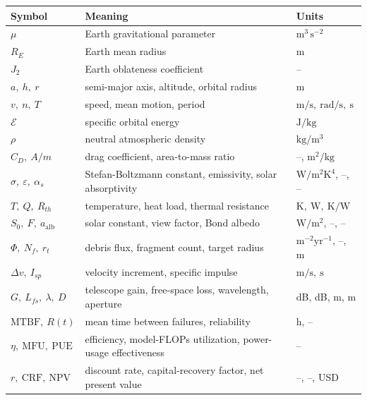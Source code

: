 \documentclass[
  11pt,
  openany,
  oneside]{book}
\newcounter{none} %
\begin{document}
{\def\LTcaptype{none} %
\begin{longtable}[]{@{}
  >{\raggedright\arraybackslash}p{}
  >{\raggedright\arraybackslash}p{}
  >{\raggedright\arraybackslash}p{}@{}}
\toprule\noalign{}
\begin{minipage}[b]{\linewidth}\raggedright
Symbol
\end{minipage} & \begin{minipage}[b]{\linewidth}\raggedright
Meaning
\end{minipage} & \begin{minipage}[b]{\linewidth}\raggedright
Units
\end{minipage} \\
\midrule\noalign{}
\endhead
\bottomrule\noalign{}
\endlastfoot
\(\mu\) & Earth gravitational parameter & \(\mathrm{m^3\,s^{-2}}\) \\
\(R_E\) & Earth mean radius & \(\mathrm{m}\) \\
\(J_2\) & Earth oblateness coefficient & -- \\
\(a,\ h,\ r\) & semi-major axis, altitude, orbital radius &
\(\mathrm{m}\) \\
\(v,\ n,\ T\) & speed, mean motion, period &
\(\mathrm{m/s,\ rad/s,\ s}\) \\
\(\mathcal{E}\) & specific orbital energy & \(\mathrm{J/kg}\) \\
\(\rho\) & neutral atmospheric density & \(\mathrm{kg/m^3}\) \\
\(C_D,\ A/m\) & drag coefficient, area-to-mass ratio & --,
\(\mathrm{m^2/kg}\) \\
\(\sigma,\ \varepsilon,\ \alpha_s\) & Stefan-Boltzmann constant,
emissivity, solar absorptivity & \(\mathrm{W/m^2K^4}\), --, -- \\
\(T,\ Q,\ R_{th}\) & temperature, heat load, thermal resistance &
\(\mathrm{K,\ W,\ K/W}\) \\
\(S_0,\ F,\ a_{\mathrm{alb}}\) & solar constant, view factor, Bond
albedo & \(\mathrm{W/m^2}\), --, -- \\
\(\Phi,\ N_f,\ r_t\) & debris flux, fragment count, target radius &
\(\mathrm{m^{-2}yr^{-1}}\), --, \(\mathrm{m}\) \\
\(\Delta v,\ I_{sp}\) & velocity increment, specific impulse &
\(\mathrm{m/s,\ s}\) \\
\(G,\ L_{fs},\ \lambda,\ D\) & telescope gain, free-space loss,
wavelength, aperture & dB, dB, m, m \\
\(\mathrm{MTBF},\ R(t)\) & mean time between failures, reliability & h,
-- \\
\(\eta,\ \mathrm{MFU},\ \mathrm{PUE}\) & efficiency, model-FLOPs
utilization, power-usage effectiveness & -- \\
\(r,\ \mathrm{CRF},\ \mathrm{NPV}\) & discount rate, capital-recovery
factor, net present value & --, --, USD \\
\end{longtable}
}
\end{document}
